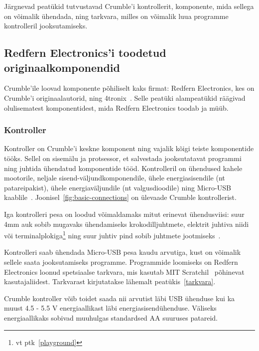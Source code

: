 \documentclass[12pt]{article}
\begin{document}
Järgnevad peatükid tutvustavad Crumble’i kontrollerit, komponente, mida sellega on võimalik ühendada, ning tarkvara, milles on võimalik luua programme kontrolleril jooksutamiseks.

\subsection{Redfern Electronics’i toodetud originaalkomponendid}
Crumble’ile loovad komponente põhiliselt kaks firmat: Redfern Electronics, kes on Crumble’i originaalautorid, ning 4tronix~\cite{4tronix}. Selle peatüki alampeatükid räägivad olulisematest komponentidest, mida Redfern Electronics toodab ja müüb.

\subsubsection{Kontroller} \label{sec:kontroller}

Kontroller on Crumble’i keskne komponent ning vajalik kõigi teiste komponentide tööks. Sellel on sisemälu ja protsessor, et salvestada jooksutatavat programmi ning juhtida ühendatud komponentide tööd. Kontrolleril on ühendused kahele mootorile, neljale sisend-väljundkomponendile, ühele energiasisendile (nt patareipakist), ühele energiaväljundile (nt valgusdioodile) ning Micro-USB kaablile~\cite{TheCrumbleController}. Joonisel~\ref{fig:basic-connections} on ülevaade Crumble kontrollerist.


Iga kontrolleri pesa on loodud võimaldamaks mitut erinevat ühendusviisi: suur 4mm auk sobib mugavaks ühendamiseks krokodilljuhtmete, elektrit juhtiva niidi või terminalplokiga\footnote{vt ptk~\ref{playground}} ning suur juhtiv pind sobib juhtmete jootmiseks~\cite{TheCrumbleController}.

Kontrolleri saab ühendada Micro-USB pesa kaudu arvutiga, kust on võimalik sellele saata jooksutamiseks programme. Programmide loomiseks on Redfern Electronics loonud spetsiaalse tarkvara, mis kasutab MIT Scratchil~\cite{Scratch-ImagineProgramShare} põhinevat kasutajaliidest. Tarkvarast kirjutatakse lähemalt peatükis~\ref{tarkvara}.

Crumble kontroller võib toidet saada nii arvutist läbi USB ühenduse kui ka muust 4.5 - 5.5 V energiaallikast läbi energiasisendühenduse. Väliseks energiaallikaks sobivad muuhulgas standardsed AA suuruses patareid.
\end{document}

